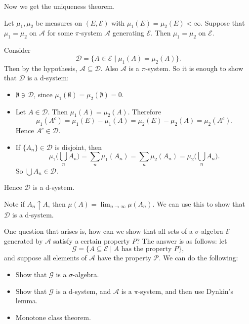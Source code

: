 \documentclass[12pt]{article}
\begin{document}
Now we get the uniqueness theorem.

\begin{theorem}
	Let $\mu_1, \mu_2$ be measures on $(E, \mathcal{E})$ with $\mu_1(E) = \mu_2(E) < \infty$. Suppose that $\mu_1 = \mu_2$ on $\mathcal{A}$ for some $\pi$-system $\mathcal{A}$ generating $\mathcal{E}$. Then $\mu_1 = \mu_2$ on $\mathcal{E}$.
\end{theorem}

\begin{proofbox}
	Consider
	\[
		\mathcal{D} = \{A \in \mathcal{E} \mid \mu_1(A) = \mu_2(A)\}.
	\]
	Then by the hypothesis, $\mathcal{A} \subseteq \mathcal{D}$. Also $\mathcal{A}$ is a $\pi$-system. So it is enough to show that $\mathcal{D}$ is a d-system:
	\begin{itemize}
		\item $\emptyset \ni \mathcal{D}$, since $\mu_1(\emptyset) = \mu_2(\emptyset) = 0$.
		\item Let $A \in \mathcal{D}$. Then $\mu_1(A) = \mu_2(A)$. Therefore
			\[
			\mu_1(A^{c}) = \mu_1(E) - \mu_1(A) = \mu_2(E) - \mu_2(A) = \mu_2(A^{c}).
			\]
			Hence $A^{c} \in \mathcal{D}$.
		\item If $\{A_n\} \in \mathcal{D}$ is disjoint, then
			\[
			\mu_1 \Biggl( \bigcup_n A_n \Biggr) = \sum_{n} \mu_1 (A_n) = \sum_n \mu_2 (A_n) = \mu_2 \Biggl( \bigcup_{n} A_n \Biggr).
			\]
			So $\bigcup A_n \in \mathcal{D}$.
	\end{itemize}
	Hence $\mathcal{D}$ is a d-system.
\end{proofbox}

Note if $A_n \uparrow A$, then $\mu(A) = \lim_{n \to \infty} \mu(A_n)$. We can use this to show that $\mathcal{D}$ is a d-system.

One question that arises is, how can we show that all sets of a $\sigma$-algebra $\mathcal{E}$ generated by $\mathcal{A}$ satisfy a certain property $P$? The answer is as follows: let
\[
	\mathcal{G} = \{A \subseteq \mathcal{E} \mid A \text{ has the property } P\},
\]
and suppose all elements of $\mathcal{A}$ have the property $\mathcal{P}$. We can do the following:
\begin{itemize}
	\item Show that $\mathcal{G}$ is a $\sigma$-algebra.
	\item Show that $\mathcal{G}$ is a d-system, and $\mathcal{A}$ is a $\pi$-system, and then use Dynkin's lemma.
	\item Monotone class theorem.
\end{itemize}
\end{document}
